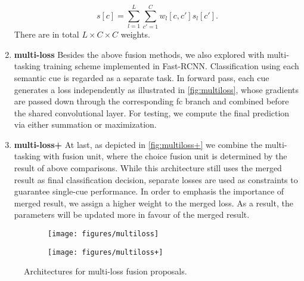 \begin{enumerate}
\begin{equation}
s\left[c\right] = \sum_{l=1}^{L}\sum_{c'=1}^{C}w_{l}\left[c,c'\right] s_{l}\left[c'\right].
\end{equation}
There are in total $ L \times C \times C $ weights. 
\item \textbf{multi-loss} 
Besides the above fusion methods, we also explored with multi-tasking training scheme implemented in Fast-RCNN. 
Classification using each semantic cue is regarded as a separate task.
In forward pass, each cue generates a loss independently as illustrated in \autoref{fig:multiloss}, whose gradients are passed down through the corresponding fc branch and combined before the shared convolutional layer.
For testing, we compute the final prediction via either summation or maximization.
\item \textbf{multi-loss+}
At last, as depicted in \autoref{fig:multiloss+} we combine the multi-tasking with fusion unit, where the choice fusion unit is determined by the result of above comparisons.
While this architecture still uses the merged result as final classification decision, separate losses are used as constraints to guarantee single-cue performance.
In order to emphasis the importance of merged result, we assign a higher weight to the merged loss. 
As a result, the parameters will be updated more in favour of the merged result.
\end{enumerate}

\begin{figure}[h]
\begin{subfigure}[b]{0.5\linewidth}
\texttt{[image: figures/multiloss]}
\label{fig:multiloss}
\end{subfigure}
\begin{subfigure}[b]{0.5\linewidth}
\texttt{[image: figures/multiloss+]}
\label{fig:multiloss+}
\end{subfigure}
\caption[Multiloss Fusion Variants]{Architectures for multi-loss fusion proposals.}
\end{figure}